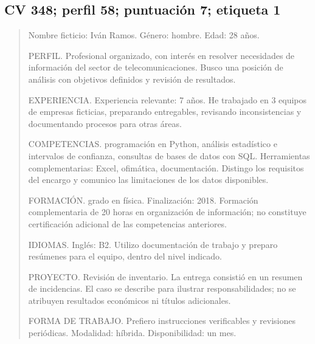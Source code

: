 \documentclass[11pt,a4paper,oneside]{report}
\begin{document}
\subsection*{CV 348; perfil 58; puntuación 7; etiqueta 1}
\begin{quote}\small Nombre ficticio: Iván Ramos. Género: hombre. Edad: 28 años.\par PERFIL. Profesional organizado, con interés en resolver necesidades de información del sector de telecomunicaciones. Busco una posición de análisis con objetivos definidos y revisión de resultados.\par \par EXPERIENCIA. Experiencia relevante: 7 años. He trabajado en 3 equipos de empresas ficticias, preparando entregables, revisando inconsistencias y documentando procesos para otras áreas.\par \par COMPETENCIAS. programación en Python, análisis estadístico e intervalos de confianza, consultas de bases de datos con SQL. Herramientas complementarias: Excel, ofimática, documentación. Distingo los requisitos del encargo y comunico las limitaciones de los datos disponibles.\par \par FORMACIÓN. grado en física. Finalización: 2018. Formación complementaria de 20 horas en organización de información; no constituye certificación adicional de las competencias anteriores.\par \par IDIOMAS. Inglés: B2. Utilizo documentación de trabajo y preparo resúmenes para el equipo, dentro del nivel indicado.\par \par PROYECTO. Revisión de inventario. La entrega consistió en un resumen de incidencias. El caso se describe para ilustrar responsabilidades; no se atribuyen resultados económicos ni títulos adicionales.\par \par FORMA DE TRABAJO. Prefiero instrucciones verificables y revisiones periódicas. Modalidad: híbrida. Disponibilidad: un mes.
\end{quote}
\end{document}
